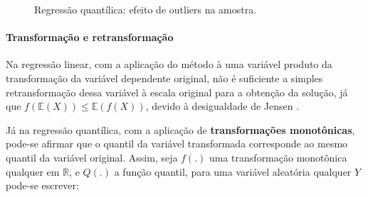 \documentclass[a4paper, 12pt]{article}
\let\oldparagraph\paragraph
\renewcommand{\paragraph}[1]{\oldparagraph{#1}\mbox{}}
\begin{document}
\begin{figure}[H]

{\centering {}

}

\caption{Regressão quantílica: efeito de outliers na amostra.}\label{fig:outlier}
\end{figure}

\hypertarget{transformacao-e-retransformacao}{%
\paragraph{Transformação e
retransformação}\label{transformacao-e-retransformacao}}

Na regressão linear, com a aplicação do método à uma variável produto da
transformação da variável dependente original, não é suficiente a
simples retransformação dessa variável à escala original para a obtenção
da solução, já que \(f(\mathbb{E}(X)) \leq \mathbb{E}(f(X))\), devido à
desigualdade de Jensen \autocite[ver][p.~207]{moda_media_mediana}.

Já na regressão quantílica, com a aplicação de \textbf{transformações
monotônicas}, pode-se afirmar que o quantil da variável transformada
corresponde ao mesmo quantil da variável original. Assim, seja \(f(.)\)
uma transformação monotônica qualquer em \(\mathbb{R}\), e \(Q(.)\) a
função quantil, para uma variável aleatória qualquer \(Y\) pode-se
escrever:
\end{document}
